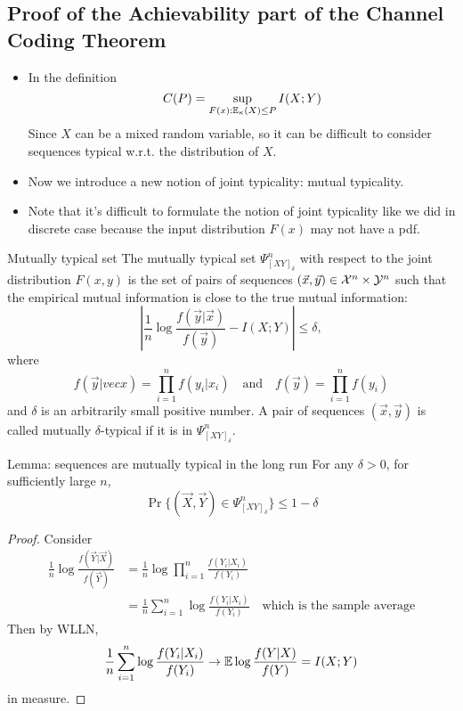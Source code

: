 \documentclass[../main.tex]{subfiles}
\begin{document}
\subsection{Proof of the Achievability part of the Channel Coding Theorem}
\begin{itemize}
    \item In the definition \[
    C(P) = \sup_{F(x):\mathbb{E}_\kappa(X)\leq P}I(X;Y)
    \]
    Since $X$ can be a mixed random variable, so it can be difficult to consider sequences typical w.r.t. the distribution of $X$.
    \item Now we introduce a new notion of joint typicality: mutual typicality.
    \item Note that it's difficult to formulate the notion of joint typicality like we did in discrete case because the input distribution $F(x)$ may not have a pdf.
\end{itemize}
\begin{gbox}{Mutually typical set}
    The mutually typical set $\Psi^n_{[XY]_\delta}$ with respect to the joint distribution $F(x,y)$ is the set of pairs of sequences $(\vec x,\vec y)\in \mathcal{X}^n\times\mathcal{Y}^n$ such that the empirical mutual information is close to the true mutual information: \[
    |\frac{1}{n}\log\frac{f(\vec y|\vec x)}{f(\vec y)}-I(X;Y)|\leq \delta,
    \] where \[
    f(\vec y|vec x)=\prod^n_{i=1}f(y_i|x_i)\quad \text{and}\quad f(\vec y)=\prod_{i=1}^n f(y_i)
    \] and $\delta$ is an arbitrarily small positive number. A pair of sequences $(\vec x,\vec y)$ is called mutually $\delta$-typical if it is in $\Psi^n_{[XY]_\delta}$.
\end{gbox}
\begin{bbox}{Lemma: sequences are mutually typical in the long run}
    For any $\delta >0$, for sufficiently large $n$, \[
    \Pr\{(\vec X,\vec Y)\in \Psi^n_{[XY]_\delta}\}\leq 1-\delta
    \]
    \begin{proof}
        Consider \begin{align*}
            \frac{1}{n}\log\frac{f(\vec Y|\vec X)}{f(\vec Y)} &= \frac{1}{n}\log\prod_{i=1}^n\frac{f(Y_i|X_i)}{f(Y_i)}\\
            &=\frac{1}{n}\sum_{i=1}^n\log\frac{f(Y_i|X_i)}{f(Y_i)} \quad\text{which is the sample average}
        \end{align*}
        Then by WLLN, \[
        \frac{1}{n}\sum_{i=1}^n\log\frac{f(Y_i|X_i)}{f(Y_i)} \to \mathbb{E} \log\frac{f(Y|X)}{f(Y)}=I(X;Y)
        \] in measure.
    \end{proof}
\end{bbox}
\end{document}

